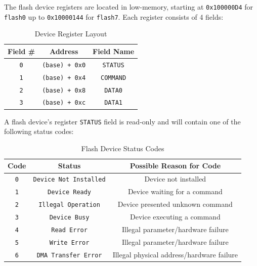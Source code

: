 \documentclass[12pt,a4paper,openright,twoside]{report}
\begin{document}
	The flash device registers are located in low-memory, starting at \texttt{0x100000D4} for \texttt{flash0} up to \texttt{0x10000144} for \texttt{flash7}.
	Each register consists of 4 fields:
	\begin{table}[h]
	\centering
	\begin{tabular}{c|c|c}
	Field \# & Address & Field Name \\  \hline\hline
	\texttt{0} & \texttt{(base) + 0x0} & \texttt{STATUS} \\ \hline
	\texttt{1} & \texttt{(base) + 0x4} & \texttt{COMMAND} \\ \hline
	\texttt{2} & \texttt{(base) + 0x8} & \texttt{DATA0} \\ \hline
	\texttt{3} & \texttt{(base) + 0xc} & \texttt{DATA1}
	\end{tabular}
	\caption{Device Register Layout}
	\label{tab:device_register_layout}
	\end{table}

	A flash device's register \texttt{STATUS} field is read-only and will contain one of the following status codes:
	\begin{table}[h]
	\centering
	\begin{tabular}{c|c|c}
	Code & Status & Possible Reason for Code \\  \hline\hline
	\texttt{0} & \texttt{Device Not Installed} & Device not installed \\ \hline
	\texttt{1} & \texttt{Device Ready} & Device waiting for a command \\ \hline
	\texttt{2} & \texttt{Illegal Operation} & Device presented unknown command \\ \hline
	\texttt{3} & \texttt{Device Busy} & Device executing a command \\ \hline
	\texttt{4} & \texttt{Read Error} & Illegal parameter/hardware failure \\ \hline
	\texttt{5} & \texttt{Write Error} & Illegal parameter/hardware failure \\ \hline
	\texttt{6} & \texttt{DMA Transfer Error} & Illegal physical address/hardware failure
	\end{tabular}
	\caption{Flash Device Status Codes}
	\end{table}
	
\end{document}

